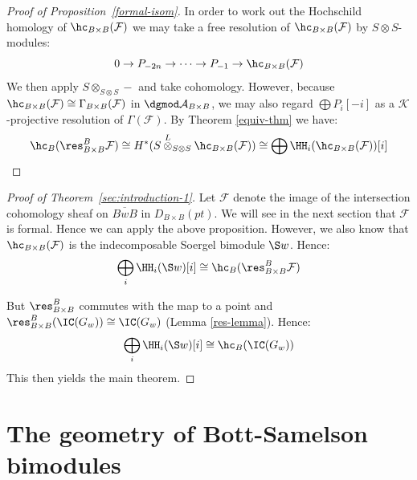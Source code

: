 \documentclass[12pt]{wart}
\theoremstyle{remark}
\begin{document}
\begin{proof}[Proof of Proposition~\ref{formal-isom}] In order to work out the Hochschild homology of $\hc_{B \times B}(\mathcal{F})$ we may take a free resolution of $\hc_{B \times B}(\mathcal{F})$ by $S \otimes S$-modules:
\begin{equation*}
0 \to P_{-2n} \to \dots \to P_{-1} \to \hc_{B \times B}(\mathcal{F})
\end{equation*}
We then apply $S \otimes_{S \otimes S} -$ and take
cohomology. However, because $ \hc_{B \times B}(\mathcal{F}) \cong
\Gamma_{B \times B}(\mathcal{F})$ in $\dgmod\mathcal{A}_{B \times B}$, we
may also regard $\bigoplus P_i[-i]$ as a $\mathcal{K}$-projective
resolution of $\Gamma(\mathcal{F})$. By Theorem \ref{equiv-thm} we have:
\begin{equation*}
\hc_B(\res_{B \times B}^B \mathcal{F}) \cong H^*( S \overset{L}{\otimes}_{S \otimes S}  \hc_{B \times B}(\mathcal{F})) \cong \bigoplus \HH_i( \hc_{B \times B}(\mathcal{F}))[i]%
\end{equation*}
\end{proof}


\begin{proof}[Proof of Theorem~\ref{sec:introduction-1}] 
  Let $\mathcal{F}$ denote the image of the intersection cohomology
  sheaf on $\overline{BwB}$ in $D_{B \times B}(pt)$. We will see in the next section
  that $\mathcal{F}$ is formal. Hence we can apply the above
  proposition. However, we also know that $\hc_{B \times
    B}(\mathcal{F})$ is the indecomposable Soergel bimodule $\S w$.
  Hence:
  \begin{equation*}
    \bigoplus_i \HH_i(\S w)[i] \cong \hc_B (\res_{B \times B}^B \mathcal{F}) %
  \end{equation*}

But $\res_{B \times B}^B$ commutes with the map to a point and $\res_{B \times B}^B(\IC(G_w)) \cong \IC(G_w)$ (Lemma \ref{res-lemma}). Hence:
\begin{displaymath}
\bigoplus_i \HH_i(\S w)[i] \cong \hc_B(\IC(G_w)) %
\end{displaymath}
  This then yields the main theorem.
\end{proof}


\section{The geometry of Bott-Samelson bimodules}
\label{sec:geom-soerg-bimod}
\end{document}
